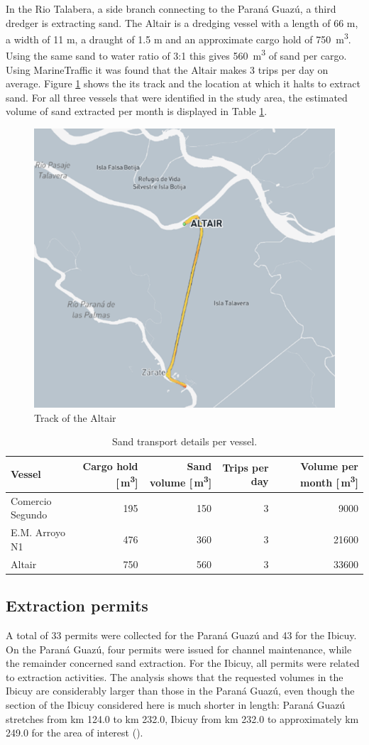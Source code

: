 In the Rio Talabera, a side branch connecting to the Paraná Guazú, a third dredger is extracting sand. The Altair is a dredging vessel with a length of 66 m, a width of 11 m, a draught of 1.5 m and an approximate cargo hold of 750 \,m\textsuperscript{3}. Using the same sand to water ratio of 3:1 this gives 560 \,m\textsuperscript{3} of sand per cargo. Using MarineTraffic it was found that the Altair makes 3 trips per day on average. Figure \ref{fig:Altair_track} shows the its track and the location at which it halts to extract sand. For all three vessels that were identified in the study area, the estimated volume of sand extracted per month is displayed in Table \ref{tab:sand_volume}.

\begin{figure}[H]
    \centering
    \includegraphics[width=0.5\linewidth]{figures/ch5/Track_Altair.png}
    \caption{Track of the Altair}
    \label{fig:Altair_track}
\end{figure}


\begin{table}[h!]
\centering
\begin{tabular}{lrrrr}
\hline
\textbf{Vessel} & \textbf{Cargo hold [\,m\textsuperscript{3}]} & \textbf{Sand volume [\,m\textsuperscript{3}]} & \textbf{Trips per day} & \textbf{Volume per month [\,m\textsuperscript{3}]} \\
\hline
Comercio Segundo & 195 & 150 & 3 & 9000 \\
E.M. Arroyo N1 & 476 & 360 & 3 & 21600 \\
Altair & 750 & 560 & 3 & 33600 \\
\hline
\end{tabular}
\caption{Sand transport details per vessel.}
\label{tab:sand_volume}
\end{table}

\subsection{Extraction permits}
A total of 33 permits were collected for the Paraná Guazú and 43 for the Ibicuy. On the Paraná Guazú, four permits were issued for channel maintenance, while the remainder concerned sand extraction. For the Ibicuy, all permits were related to extraction activities. The analysis shows that the requested volumes in the Ibicuy are considerably larger than those in the Paraná Guazú, even though the section of the Ibicuy considered here is much shorter in length: Paraná Guazú stretches from km 124.0 to km 232.0, Ibicuy from km 232.0 to approximately km 249.0 for the area of interest (\cite{AGPComenzoBatimetria2023}).

